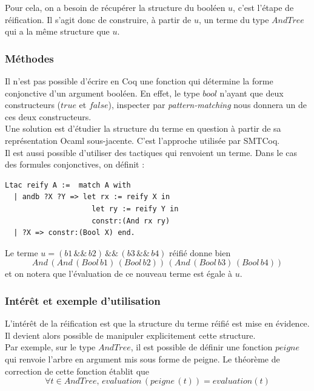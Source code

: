 \documentclass[11pt]{article}
\begin{document}
Pour cela, on a besoin de récupérer la structure du booléen $u$, c'est l'étape de réification. Il s'agit donc de construire, à partir de $u$, un terme du type $AndTree$ qui a la même structure que $u$.

\subsubsection{Méthodes}

Il n'est pas possible d'écrire en Coq une fonction qui détermine la forme conjonctive d'un argument booléen. En effet, le type $bool$ n'ayant que deux constructeurs ($true$ et $false$), inspecter par \textit{pattern-matching} nous donnera un de ces deux constructeurs.\\

Une solution est d'étudier la structure du terme en question à partir de sa représentation Ocaml sous-jacente. C'est l'approche utilisée par SMTCoq. \\

Il est aussi possible d'utiliser des tactiques qui renvoient un terme. Dans le cas des formules conjonctives, on définit :

\begin{lstlisting}[frame=single]
Ltac reify A :=  match A with
  | andb ?X ?Y => let rx := reify X in
                    let ry := reify Y in
                    constr:(And rx ry)
  | ?X => constr:(Bool X) end.

\end{lstlisting}

Le terme $u = (b1\,\&\&\,b2)\,\&\&\,(b3\,\&\&\,b4)$ réifié donne bien 
\[And\,(And\,(Bool\,b1)\,(Bool\,b2))\,(And\,(Bool\,b3)\,(Bool\,b4))\] 
et on notera que l'évaluation de ce nouveau terme est égale à $u$.



\subsubsection{Intérêt et exemple d'utilisation} \label{interet_reification}

L'intérêt de la réification est que la structure du terme réifié est mise en évidence. Il devient alors possible de manipuler explicitement cette structure. \\

Par exemple, sur le type $AndTree$, il est possible de définir une fonction $peigne$ qui renvoie l'arbre en argument mis sous forme de peigne. Le théorème de correction de cette fonction établit que 
\[ \forall t \in AndTree, \, evaluation \, (peigne \, (t)) = evaluation (t) \]
\end{document}
